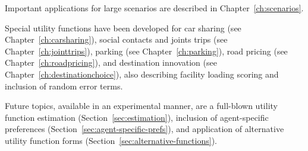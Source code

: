 Important applications for large scenarios are described in Chapter~\ref{ch:scenarios}.

Special utility functions have been developed for car sharing (see Chapter~\ref{ch:carsharing}), social contacts and joints trips (see Chapter~\ref{ch:jointtrips}), parking (see Chapter~\ref{ch:parking}), road pricing (see Chapter~\ref{ch:roadpricing}), and destination innovation (see Chapter~\ref{ch:destinationchoice}), also describing facility loading scoring and inclusion of random error terms. 
 
Future topics, available in an experimental manner, are a full-blown utility function estimation (Section~\ref{sec:estimation}), inclusion of agent-specific preferences (Section~\ref{sec:agent-specific-prefs}), and application of alternative utility function forms (Section~\ref{sec:alternative-functions}).

